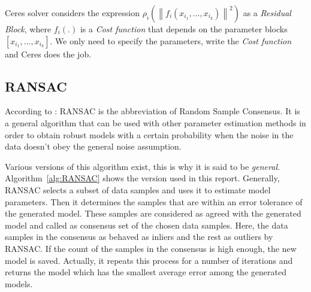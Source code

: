 Ceres solver considers the expression $\rho_i \left(\left\lVert f_i(x_{i_1}, ..., x_{i_k})  \right\rVert^2 \right)$ as a \emph{Residual Block}, where $f_i(.)$ is a \emph{Cost function} that depends on the parameter blocks $[x_{i_1}, ..., x_{i_k}]$.
We only need to specify the parameters, write the \emph{Cost function} and Ceres does the job.


\subsection{RANSAC}
According to \cite{ransac}:
RANSAC is the abbreviation of Random Sample Consensus. It is a general algorithm that can be used with other parameter estimation methods in order to obtain robust models with a certain probability when the noise in the data doesn't obey the general noise assumption.

Various versions of this algorithm exist, this is why it is said to be \emph{general}. Algorithm~\ref{alg:RANSAC} shows the version used in this report. Generally, RANSAC selects a subset of data samples and uses it to estimate model parameters. Then it determines the samples that are within an error tolerance of the generated model. These samples are considered as agreed with the generated model and called as consensus set of the chosen data samples. Here, the data samples in the consensus as
behaved as inliers and the rest as outliers by RANSAC. If the count of the samples in the consensus is high enough, the new model is saved. Actually, it repeats this process for a number of iterations and returns the model which has the smallest average error among the generated models.

